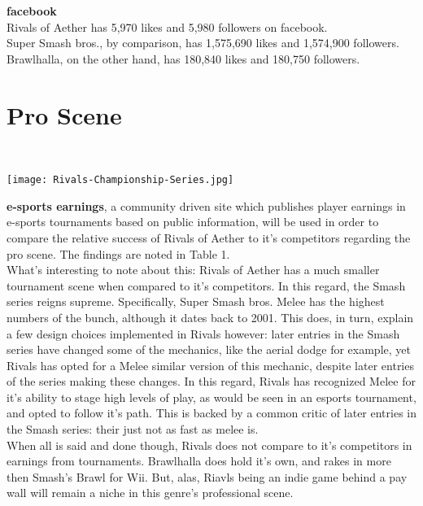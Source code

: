 \documentclass{article}
\begin{document}
\textbf{facebook}\\
Rivals of Aether has 5,970 likes and 5,980 followers on facebook. \cite{fb:11}\\
Super Smash bros., by comparison, has 1,575,690 likes and 1,574,900 followers. \cite{fbs:12}\\
Brawlhalla, on the other hand, has 180,840 likes and 180,750 followers.\cite{fbb:13}\\

\chapter{\textbf{Pro Scene}}\\

\begin{center}
\texttt{[image: Rivals-Championship-Series.jpg]}
\end{center}
\textbf{e-sports earnings}, a community driven site which publishes player earnings in e-sports tournaments based on public information, will be used in order to compare the relative success of Rivals of Aether to it's competitors regarding the pro scene. The findings are noted in Table 1.\\
What's interesting to note about this: Rivals of Aether has a much smaller tournament scene when compared to it's competitors. In this regard, the Smash series reigns supreme. Specifically, Super Smash bros. Melee has the highest numbers of the bunch, although it dates back to 2001. This does, in turn, explain a few design choices implemented in Rivals however: later entries in the Smash series have changed some of the mechanics, like the aerial dodge for example, yet Rivals has opted for a Melee similar version of this mechanic, despite later entries of the series making these changes. In this regard, Rivals has recognized Melee for it's ability to stage high levels of play, as would be seen in an esports tournament, and opted to follow it's path. This is backed by a common critic of later entries in the Smash series: their just not as fast as melee is.\\
When all is said and done though, Rivals does not compare to it's competitors in earnings from tournaments. Brawlhalla does hold it's own, and rakes in more then Smash's Brawl for Wii. But, alas, Riavls being an indie game behind a pay wall will remain a niche in this genre's professional scene.\\
\end{document}
